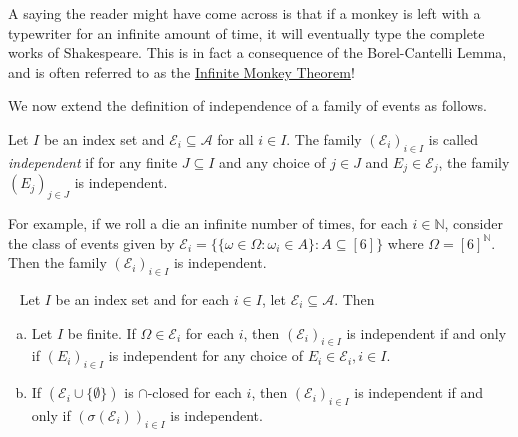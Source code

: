 A saying the reader might have come across is that if a monkey is left with a typewriter for an infinite amount of time, it will eventually type the complete works of Shakespeare. This is in fact a consequence of the Borel-Cantelli Lemma, and is often referred to as the \href{https://en.wikipedia.org/wiki/Infinite_monkey_theorem}{Infinite Monkey Theorem}!

\vspace{2mm}
We now extend the definition of independence of a family of events as follows.

\begin{definition}
\label{independence of classes of events}
    Let $I$ be an index set and $\mathcal{E}_i\subseteq\mathcal{A}$ for all $i\in I$. The family $(\mathcal{E}_i)_{i\in I}$ is called \textit{independent} if for any finite $J\subseteq I$ and any choice of $j\in J$ and $E_j\in\mathcal{E}_j$, the family $(E_j)_{j\in J}$ is independent.
\end{definition}

For example, if we roll a die an infinite number of times, for each $i\in\mathbb{N}$, consider the class of events given by $\mathcal{E}_i=\{\{\omega\in\Omega:\omega_i\in A\}:A\subseteq[6]\}$
where $\Omega=[6]^\mathbb{N}$. Then the family $(\mathcal{E}_i)_{i\in I}$ is independent.

\begin{theorem}
\label{independent set classes subset}
~
    Let $I$ be an index set and for each $i\in I$, let $\mathcal{E}_i\subseteq \mathcal{A}$. Then
    \begin{enumerate}[(a)]
        \item Let $I$ be finite. If $\Omega\in\mathcal{E}_i$ for each $i$, then $(\mathcal{E}_i)_{i\in I}$ is independent if and only if $(E_i)_{i\in I}$ is independent for any choice of $E_i\in\mathcal{E}_i, i\in I$.
        
        \item If $(\mathcal{E}_i\cup\{\emptyset\})$ is $\cap$-closed for each $i$, then $(\mathcal{E}_i)_{i\in I}$ is independent if and only if $(\sigma(\mathcal{E}_i))_{i\in I}$ is independent.
        
    \end{enumerate}
\end{theorem}

